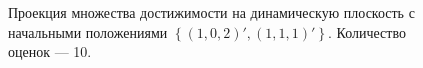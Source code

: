 \documentclass[10pt, a4paper]{article}
\begin{document}
\begin{figure}[H]
\caption{Проекция множества достижимости на динамическую плоскость с начальными положениями $\left\{(1,0,2)',(1,1,1)'\right\}$. Количество оценок --- 10.}
\end{figure}
\end{document}
